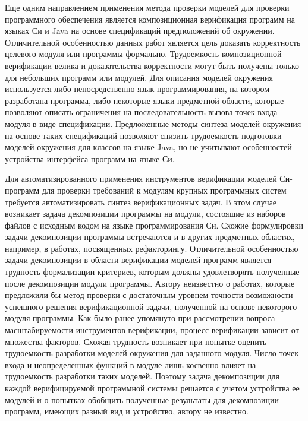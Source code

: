 Еще одним направлением применения метода проверки моделей для проверки программного обеспечения является композиционная верификация программ на языках Си и Java на основе спецификаций предположений об окружении.
Отличительной особенностью данных работ является цель доказать корректность целевого модуля или программы формально.
Трудоемкость композиционной верификации велика и доказательства корректности могут быть получены только для небольших программ или модулей.
Для описания моделей окружения используется либо непосредственно язык программирования, на котором разработана программа, либо некоторые языки предметной области, которые позволяют описать ограничения на последовательность вызова точек входа модуля в виде спецификации.
Предложенные методы синтеза моделей окружения на основе таких спецификаций позволяют снизить трудоемкость подготовки моделей окружения для классов на языке Java, но не учитывают особенностей устройства интерфейса программ на языке Си.

Для автоматизированного применения инструментов верификации моделей Си-программ для проверки требований к модулям крупных программных систем требуется автоматизировать синтез верификационных задач.
В этом случае возникает задача декомпозиции программы на модули, состоящие из наборов файлов с исходным кодом на языке программирования Си.
Схожие формулировки задачи декомпозиции программы встречаются и в других предметных областях, например, в работах, посвященных рефакторингу.
Отличительной особенностью задачи декомпозиции в области верификации моделей программ является трудность формализации критериев, которым должны удовлетворять полученные после декомпозиции модули программы.
Автору неизвестно о работах, которые предложили бы метод проверки с достаточным уровнем точности возможности успешного решения верификационной задачи, полученной на основе некоторого модуля программы.
Как было ранее упомянуто при рассмотрении вопроса масштабируемости инструментов верификации, процесс верификации зависит от множества факторов.
Схожая трудность возникает при попытке оценить трудоемкость разработки моделей окружения для заданного модуля.
Число точек входа и неопределенных функций в модуле лишь косвенно влияет на трудоемкость разработки таких моделей.
Поэтому задача декомпозиции для каждой верифицируемой программной системы решается с учетом устройства ее модулей и о попытках обобщить полученные результаты для декомпозиции программ, имеющих разный вид и устройство, автору не известно.

